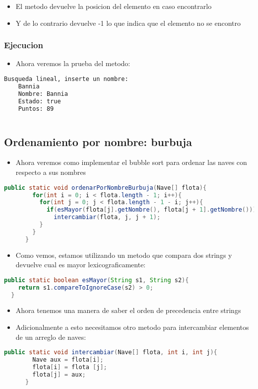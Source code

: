 \begin{itemize}
    \item El metodo devuelve la posicion del elemento en caso encontrarlo
    \item Y de lo contrario devuelve -1 lo que indica que el elemento no se encontro
\end{itemize}
\subsubsection{Ejecucion}
\begin{itemize}
    \item Ahora veremos la prueba del metodo:
\end{itemize}
    \begin{lstlisting}[language=bash, caption={Prueba del metodo}]
    Busqueda lineal, inserte un nombre:
    Bannia
    Nombre: Bannia
    Estado: true
    Puntos: 89
    
\end{lstlisting}

\subsection{Ordenamiento por nombre: burbuja}
\begin{itemize}
    \item Ahora veremos como implementar el bubble sort para ordenar las naves con respecto a sus nombres
\end{itemize}
    \begin{lstlisting}[language=java, caption={Metodo de ordenamiento burbuja por nombre}]
      public static void ordenarPorNombreBurbuja(Nave[] flota){
        for(int i = 0; i < flota.length - 1; i++){
          for(int j = 0; j < flota.length - 1 - i; j++){
            if(esMayor(flota[j].getNombre(), flota[j + 1].getNombre()))
              intercambiar(flota, j, j + 1);
          }
        }
      }
\end{lstlisting}
\begin{itemize}
    \item Como vemos, estamos utilizando un metodo que compara dos strings y devuelve cual es mayor lexicograficamente:
\end{itemize}
\begin{lstlisting}[language=java, caption={Sub metodo para comparar dos strings}]
  public static boolean esMayor(String s1, String s2){
    return s1.compareToIgnoreCase(s2) > 0;
  }
\end{lstlisting}
\begin{itemize}
    \item Ahora tenemos una manera de saber el orden de precedencia entre strings
    \item Adicionalmente a esto necesitamos otro metodo para intercambiar elementos de un arreglo de naves:
\end{itemize}
\begin{lstlisting}[language=java, caption={Sub metodo para intercambiar dos elementos}]
      public static void intercambiar(Nave[] flota, int i, int j){
        Nave aux = flota[i];
        flota[i] = flota [j];
        flota[j] = aux;
      }
\end{lstlisting}
